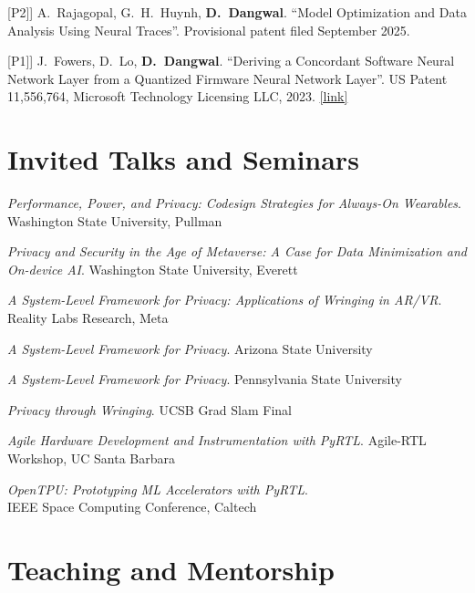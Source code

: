 \documentclass[11pt,letterpaper]{article}
\newcommand{\me}{\textbf{D.~Dangwal}}
\newcommand{\pubtarget}[1]{\raisebox{\baselineskip}[0pt][0pt]{\hypertarget{pub:#1}{}}[#1]}
\newcommand{\paperlink}[1]{\href{#1}{[link]}}
\begin{document}
\begin{publist}
\item[\pubtarget{P2}] A.~Rajagopal, G.~H.~Huynh, \me. ``Model Optimization and Data Analysis Using Neural Traces''. Provisional patent filed September 2025.
\item[\pubtarget{P1}] J.~Fowers, D.~Lo, \me. ``Deriving a Concordant Software Neural Network Layer from a Quantized Firmware Neural Network Layer''. US Patent 11,556,764, Microsoft Technology Licensing LLC, 2023. \paperlink{https://patents.google.com/patent/US11556764B2/en}
\end{publist}

\section{Invited Talks and Seminars}

\begin{yearlist}
\item[2025] \emph{Performance, Power, and Privacy: Codesign Strategies for Always-On Wearables}. Washington State University, Pullman
\item[2025] \emph{Privacy and Security in the Age of Metaverse: A Case for Data Minimization and On-device AI}. Washington State University, Everett
\item[2021] \emph{A System-Level Framework for Privacy: Applications of Wringing in AR/VR}. \\ Reality Labs Research, Meta
\item[2021] \emph{A System-Level Framework for Privacy}. Arizona State University
\item[2021] \emph{A System-Level Framework for Privacy}. Pennsylvania State University
\item[2021] \emph{Privacy through Wringing}. UCSB Grad Slam Final
\item[2019] \emph{Agile Hardware Development and Instrumentation with PyRTL}. Agile-RTL Workshop, UC Santa Barbara
\item[2019] \emph{OpenTPU: Prototyping ML Accelerators with PyRTL}. \\ IEEE Space Computing Conference, Caltech
\end{yearlist}

\section{Teaching and Mentorship}
\end{document}
